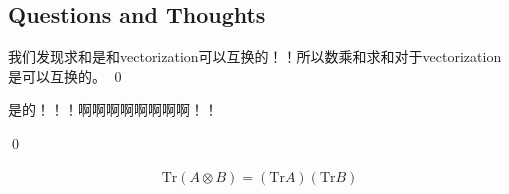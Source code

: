 \subsection{Questions and Thoughts}


我们发现求和是和vectorization可以互换的！！所以数乘和求和对于vectorization是可以互换的。
\qed 


是的！！！啊啊啊啊啊啊啊啊！！

\qed


\begin{align}
  \mathrm{Tr}(A\otimes B)=(\mathrm{Tr}A)\left(\mathrm{Tr}B\right)
\end{align}
